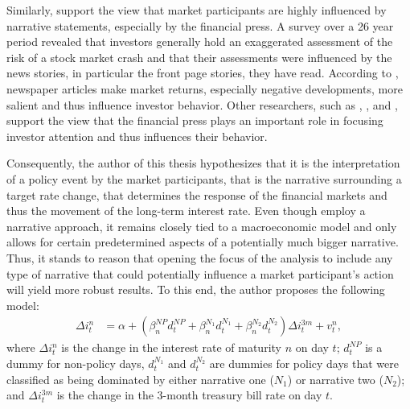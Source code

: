 \documentclass[11pt,a4paper,english,oneside]{book}
\numberwithin{equation}{chapter}
\begin{document}
Similarly, \cite{Goetzmann.2016} support the view that market participants are highly influenced by narrative statements, especially by the financial press. A survey over a 26 year period revealed that investors generally hold an exaggerated assessment of the risk of a stock market crash and that their assessments were influenced by the news stories, in particular the front page stories, they have read. %
According to \cite{Goetzmann.2016}, newspaper articles make market returns, especially negative developments, more salient and thus influence investor behavior. Other researchers, such as \cite{Engelberg.2011}, \cite{Kraussl.2014}, and \cite{Yuan.2015}, support the view that the financial press plays an important role in focusing investor attention and thus influences their behavior.


Consequently, the author of this thesis hypothesizes that it is the interpretation of a policy event by the market participants, that is the narrative surrounding a target rate change, that determines the response of the financial markets and thus the movement of the long-term interest rate. Even though \cite{Ellingsen.2003} employ a narrative approach, it remains closely tied to a macroeconomic model and only allows for certain predetermined aspects of a potentially much bigger narrative. Thus, it stands to reason that opening the focus of the analysis to include any type of narrative that could potentially influence a market participant's action will yield more robust results. To this end, the author proposes the following model:
\begin{align}\label{reg2}
\Delta i^n_t &= \alpha + (\beta_n^{NP}d_t^{NP} + \beta_n^{N_1}d_t^{N_1} + \beta_n^{N_2}d_t^{N_2})\Delta i^{3m}_t + v_t^n,
\end{align}
where $\Delta i^n_t$ is the change in the interest rate of maturity $n$ on day $t$; $d_t^{NP}$ is a dummy for non-policy days, $d_t^{N_1}$ and $d_t^{N_2}$ are dummies for policy days that were classified as being dominated by either narrative one ($N_1$) or narrative two ($N_2$); and $\Delta i^{3m}_t$ is the change in the 3-month treasury bill rate on day $t$.
\end{document}
